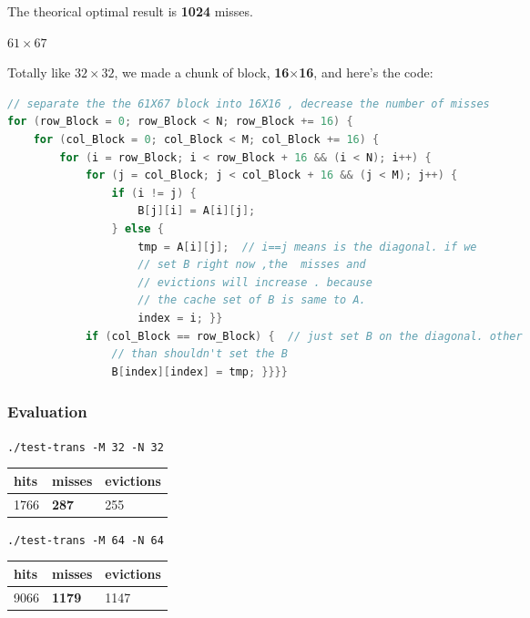 \documentclass{article}
\begin{document}
The theorical optimal result is \textbf{1024} misses. 

{\color{blue} $ 61 \times 67 $}

Totally like {\color{blue} $ 32 \times 32 $}, we made a chunk of block, \textbf{16}$ \times $\textbf{16}, and here's the code:
\begin{lstlisting}[language=c]
// separate the the 61X67 block into 16X16 , decrease the number of misses
for (row_Block = 0; row_Block < N; row_Block += 16) {
	for (col_Block = 0; col_Block < M; col_Block += 16) {
		for (i = row_Block; i < row_Block + 16 && (i < N); i++) {
			for (j = col_Block; j < col_Block + 16 && (j < M); j++) {
				if (i != j) {
					B[j][i] = A[i][j];
				} else {
					tmp = A[i][j];  // i==j means is the diagonal. if we
					// set B right now ,the  misses and
					// evictions will increase . because
					// the cache set of B is same to A.
					index = i; }}
			if (col_Block == row_Block) {  // just set B on the diagonal. other
				// than shouldn't set the B
				B[index][index] = tmp; }}}}
\end{lstlisting}

\subsubsection{Evaluation}

{\color{blue} \lstinline|./test-trans -M 32 -N 32|}
\begin{table}[!h]
	\centering  %
	\label{table1}  %
	\begin{tabular}{| m{3cm} | m{3cm} | m{3cm} |}
		\hline  %
		hits&misses&evictions \\  %
		\hline
		1766&\textbf{287}&255 \\
		\hline
	\end{tabular}
\end{table}


{\color{blue} \lstinline|./test-trans -M 64 -N 64|}
\begin{table}[!h]
	\centering  %
	\label{table1}  %
	\begin{tabular}{| m{3cm} | m{3cm} | m{3cm} |}
		\hline  %
		hits&misses&evictions \\  %
		\hline
		9066&\textbf{1179}&1147 \\
		\hline
	\end{tabular}
\end{table}
\end{document}
